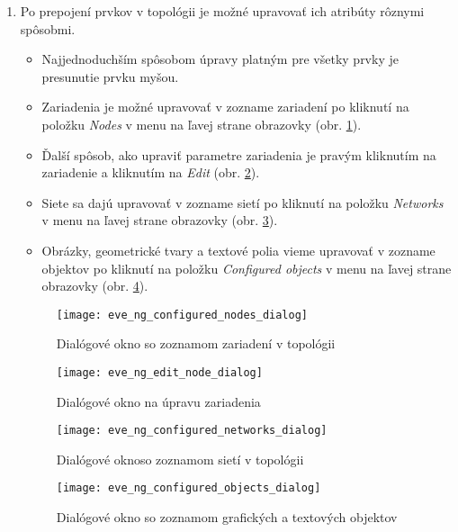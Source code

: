\begin{enumerate}[noitemsep]
    \item Po prepojení prvkov v topológii je možné upravovať ich atribúty rôznymi spôsobmi.
    
    \begin{itemize}[noitemsep]
        \item Najjednoduchším spôsobom úpravy platným pre všetky prvky je presunutie prvku myšou.
        \item Zariadenia je možné upravovať v zozname zariadení po kliknutí na položku \emph{Nodes} v menu na ľavej strane obrazovky (obr. \ref{obr:eve_ng_configured_nodes_dialog}).
        \item Ďalší spôsob, ako upraviť parametre zariadenia je pravým kliknutím na zariadenie a kliknutím na \emph{Edit} (obr. \ref{obr:eve_ng_edit_node_dialog}).
        \item Siete sa dajú upravovať v zozname sietí po kliknutí na položku \emph{Networks} v menu na ľavej strane obrazovky (obr. \ref{obr:eve_ng_configured_networks_dialog}).
        \item Obrázky, geometrické tvary a textové polia vieme upravovať v zozname objektov po kliknutí na položku \emph{Configured objects} v menu na ľavej strane obrazovky (obr. \ref{obr:eve_ng_configured_objects_dialog}).
    \end{itemize}

\begin{figure}
    \centering
    \texttt{[image: eve\_ng\_configured\_nodes\_dialog]}
    \caption{Dialógové okno so zoznamom zariadení v topológii}
    \label{obr:eve_ng_configured_nodes_dialog}
\end{figure}

\begin{figure}
    \centering
    \texttt{[image: eve\_ng\_edit\_node\_dialog]}
    \caption{Dialógové okno na úpravu zariadenia}
    \label{obr:eve_ng_edit_node_dialog}
\end{figure}

\begin{figure}
    \centering
    \texttt{[image: eve\_ng\_configured\_networks\_dialog]}
    \caption{Dialógové oknoso zoznamom sietí v topológii}
    \label{obr:eve_ng_configured_networks_dialog}
\end{figure}

\begin{figure}
    \centering
    \texttt{[image: eve\_ng\_configured\_objects\_dialog]}
    \caption{Dialógové okno so zoznamom grafických a textových objektov}
    \label{obr:eve_ng_configured_objects_dialog}
\end{figure}




\end{enumerate}
